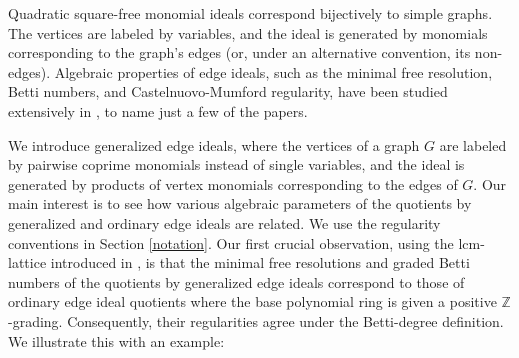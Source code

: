 \documentclass[dvipsnames,10pt]{article}
\begin{document}
Quadratic square-free monomial ideals correspond bijectively to simple graphs. The vertices are labeled by variables, and the ideal is generated by monomials corresponding to the graph's edges (or, under an alternative convention, its non-edges). Algebraic properties of edge ideals, such as the minimal free resolution, Betti numbers, and Castelnuovo-Mumford regularity, have been studied extensively in \cite{blekherman2020bounds,bouchat,dao2013bounds,fakhari2017regularity,ha2014regularity,ha2008monomial,kozlov1999complexes,morales2012regularity,woodroofe2014matchings}, to name just a few of the papers. %

We introduce generalized edge ideals, where the vertices of a graph $G$ are labeled by pairwise coprime monomials instead of single variables, and the ideal is generated by products of vertex monomials corresponding to the edges of $G$. Our main interest is to see how various algebraic parameters of the quotients by generalized and ordinary edge ideals are related. We use the regularity conventions in Section \ref{notation}. Our first crucial observation, using the lcm-lattice introduced in \cite{welker1999lcm}, is that the minimal free resolutions and graded Betti numbers of the quotients by generalized edge ideals correspond to those of ordinary edge ideal quotients where the base polynomial ring is given a positive $\mathbb{Z}$-grading. Consequently, their regularities agree under the Betti-degree definition. We illustrate this with an example:
\end{document}
